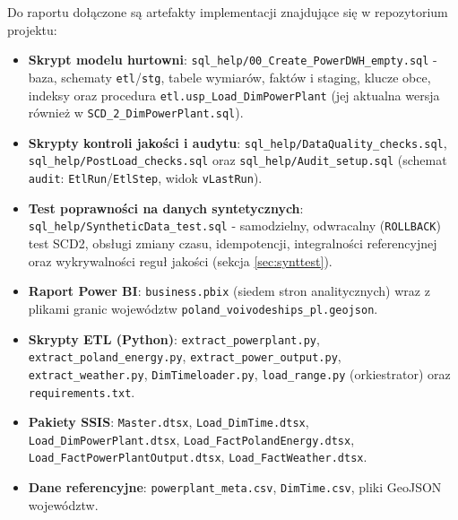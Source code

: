 \documentclass[12pt]{article}
\begin{document}
	Do raportu dołączone są artefakty implementacji znajdujące się w repozytorium projektu:
	\begin{itemize}
		\item \textbf{Skrypt modelu hurtowni}: \texttt{sql\_help/00\_Create\_PowerDWH\_empty.sql} - baza, schematy \texttt{etl}/\texttt{stg}, tabele wymiarów, faktów i staging, klucze obce, indeksy oraz procedura \texttt{etl.usp\_Load\_DimPowerPlant} (jej aktualna wersja również w \texttt{SCD\_2\_DimPowerPlant.sql}).
		\item \textbf{Skrypty kontroli jakości i audytu}: \texttt{sql\_help/DataQuality\_checks.sql}, \texttt{sql\_help/PostLoad\_checks.sql} oraz \texttt{sql\_help/Audit\_setup.sql} (schemat \texttt{audit}: \texttt{EtlRun}/\texttt{EtlStep}, widok \texttt{vLastRun}).
		\item \textbf{Test poprawności na danych syntetycznych}: \texttt{sql\_help/SyntheticData\_test.sql} - samodzielny, odwracalny (\texttt{ROLLBACK}) test SCD2, obsługi zmiany czasu, idempotencji, integralności referencyjnej oraz wykrywalności reguł jakości (sekcja \ref{sec:synttest}).
		\item \textbf{Raport Power BI}: \texttt{business.pbix} (siedem stron analitycznych) wraz z plikami granic województw \texttt{poland\_voivodeships\_pl.geojson}.
		\item \textbf{Skrypty ETL (Python)}: \texttt{extract\_powerplant.py}, \texttt{extract\_poland\_energy.py}, \texttt{extract\_power\_output.py}, \texttt{extract\_weather.py}, \texttt{DimTimeloader.py}, \texttt{load\_range.py} (orkiestrator) oraz \texttt{requirements.txt}.
		\item \textbf{Pakiety SSIS}: \texttt{Master.dtsx}, \texttt{Load\_DimTime.dtsx}, \texttt{Load\_DimPowerPlant.dtsx}, \texttt{Load\_FactPolandEnergy.dtsx}, \texttt{Load\_FactPowerPlantOutput.dtsx}, \texttt{Load\_FactWeather.dtsx}.
		\item \textbf{Dane referencyjne}: \texttt{powerplant\_meta.csv}, \texttt{DimTime.csv}, pliki GeoJSON województw.
	\end{itemize}
\end{document}
